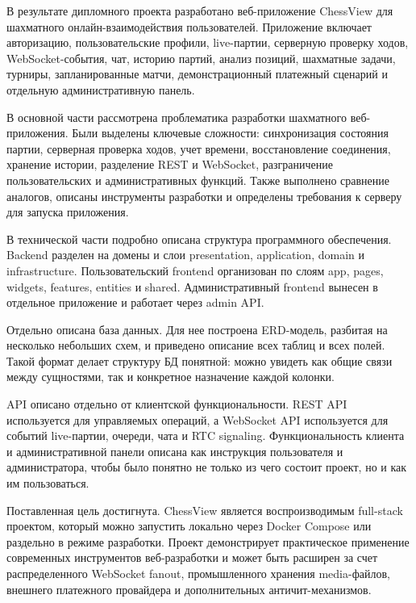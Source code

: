 
В результате дипломного проекта разработано веб-приложение ChessView для шахматного онлайн-взаимодействия пользователей. Приложение включает авторизацию, пользовательские профили, live-партии, серверную проверку ходов, WebSocket-события, чат, историю партий, анализ позиций, шахматные задачи, турниры, запланированные матчи, демонстрационный платежный сценарий и отдельную административную панель.

В основной части рассмотрена проблематика разработки шахматного веб-приложения. Были выделены ключевые сложности: синхронизация состояния партии, серверная проверка ходов, учет времени, восстановление соединения, хранение истории, разделение REST и WebSocket, разграничение пользовательских и административных функций. Также выполнено сравнение аналогов, описаны инструменты разработки и определены требования к серверу для запуска приложения.

В технической части подробно описана структура программного обеспечения. Backend разделен на домены и слои presentation, application, domain и infrastructure. Пользовательский frontend организован по слоям app, pages, widgets, features, entities и shared. Административный frontend вынесен в отдельное приложение и работает через admin API.

Отдельно описана база данных. Для нее построена ERD-модель, разбитая на несколько небольших схем, и приведено описание всех таблиц и всех полей. Такой формат делает структуру БД понятной: можно увидеть как общие связи между сущностями, так и конкретное назначение каждой колонки.

API описано отдельно от клиентской функциональности. REST API используется для управляемых операций, а WebSocket API используется для событий live-партии, очереди, чата и RTC signaling. Функциональность клиента и административной панели описана как инструкция пользователя и администратора, чтобы было понятно не только из чего состоит проект, но и как им пользоваться.

Поставленная цель достигнута. ChessView является воспроизводимым full-stack проектом, который можно запустить локально через Docker Compose или раздельно в режиме разработки. Проект демонстрирует практическое применение современных инструментов веб-разработки и может быть расширен за счет распределенного WebSocket fanout, промышленного хранения media-файлов, внешнего платежного провайдера и дополнительных античит-механизмов.
